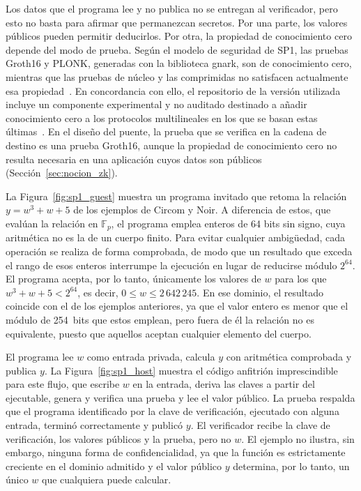 Los datos que el programa lee y no publica no se entregan al verificador, pero esto no basta para
afirmar que permanezcan secretos. Por una parte, los valores públicos pueden permitir deducirlos.
Por otra, la propiedad de conocimiento cero depende del modo de prueba. Según el modelo de
seguridad de SP1, las pruebas Groth16 y PLONK, generadas con la biblioteca gnark, son de
conocimiento cero, mientras que las pruebas de núcleo y las comprimidas no satisfacen actualmente
esa propiedad~\cite{sp1securitymodel}. En concordancia con ello, el repositorio de la versión
utilizada incluye un componente experimental y no auditado destinado a añadir conocimiento cero a
los protocolos multilineales en los que se basan estas últimas~\cite{sp1repo}. En el diseño del
puente, la prueba que se verifica en la cadena de destino es una prueba Groth16, aunque la
propiedad de conocimiento cero no resulta necesaria en una aplicación cuyos datos son públicos
(Sección~\ref{sec:nocion_zk}).

La Figura~\ref{fig:sp1_guest} muestra un programa invitado que retoma la relación
$y = w^{3} + w + 5$ de los ejemplos de Circom y Noir. A diferencia de estos, que evalúan la relación
en $\mathbb{F}_p$, el programa emplea enteros de 64 bits sin signo, cuya aritmética no es la de un
cuerpo finito. Para evitar cualquier ambigüedad, cada operación se realiza de forma comprobada, de
modo que un resultado que exceda el rango de esos enteros interrumpe la ejecución en lugar de
reducirse módulo $2^{64}$. El programa acepta, por lo tanto, únicamente los valores de $w$ para los
que $w^{3} + w + 5 < 2^{64}$, es decir, $0 \leq w \leq 2\,642\,245$. En ese dominio, el resultado
coincide con el de los ejemplos anteriores, ya que el valor entero es menor que el módulo de
254~bits que estos emplean, pero fuera de él la relación no es equivalente, puesto que aquellos
aceptan cualquier elemento del cuerpo.

El programa lee $w$ como entrada privada, calcula $y$ con aritmética comprobada y publica $y$. La
Figura~\ref{fig:sp1_host} muestra el código anfitrión imprescindible para este flujo, que escribe
$w$ en la entrada, deriva las claves a partir del ejecutable, genera y verifica una prueba y lee el
valor público. La prueba respalda que el programa identificado por la clave de verificación,
ejecutado con alguna entrada, terminó correctamente y publicó $y$. El verificador recibe la clave
de verificación, los valores públicos y la prueba, pero no $w$. El ejemplo no ilustra, sin embargo,
ninguna forma de confidencialidad, ya que la función es estrictamente creciente en el dominio
admitido y el valor público $y$ determina, por lo tanto, un único $w$ que cualquiera puede calcular.

